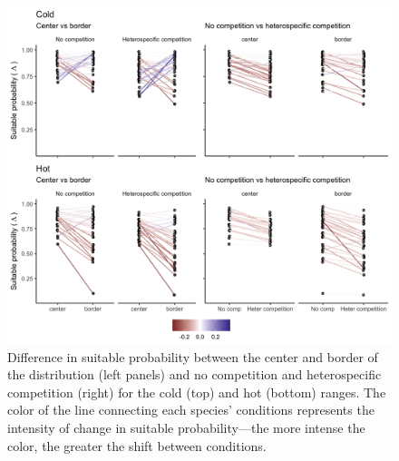 \hypertarget{fig:figsupp2}{%
\begin{figure}
\centering
\includegraphics{manuscript/figs/fig-diff_sp_raw-1.png}
\caption[{Difference in suitable probability between the center and
border of the distribution (left panels) and no competition and
heterospecific competition (right) for the cold (top) and hot (bottom)
ranges.}]{Difference in suitable probability between the center and
border of the distribution (left panels) and no competition and
heterospecific competition (right) for the cold (top) and hot (bottom)
ranges. The color of the line connecting each species' conditions
represents the intensity of change in suitable probability---the more
intense the color, the greater the shift between conditions.}
\label{fig:figsupp2}
\end{figure}
}

\newpage

